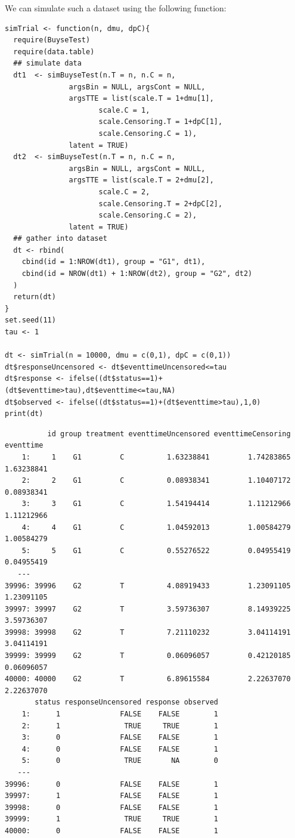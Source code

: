 \documentclass[12pt]{article}
\begin{document}
\clearpage

We can simulate such a dataset using the following function:
\lstset{language=r,label= ,caption= ,captionpos=b,numbers=none}
\begin{lstlisting}
simTrial <- function(n, dmu, dpC){
  require(BuyseTest)
  require(data.table)
  ## simulate data
  dt1  <- simBuyseTest(n.T = n, n.C = n, 
		       argsBin = NULL, argsCont = NULL, 
		       argsTTE = list(scale.T = 1+dmu[1],
				      scale.C = 1,
				      scale.Censoring.T = 1+dpC[1],
				      scale.Censoring.C = 1),
		       latent = TRUE)
  dt2  <- simBuyseTest(n.T = n, n.C = n, 
		       argsBin = NULL, argsCont = NULL, 
		       argsTTE = list(scale.T = 2+dmu[2],
				      scale.C = 2,
				      scale.Censoring.T = 2+dpC[2],
				      scale.Censoring.C = 2),
		       latent = TRUE)
  ## gather into dataset
  dt <- rbind(
    cbind(id = 1:NROW(dt1), group = "G1", dt1),
    cbind(id = NROW(dt1) + 1:NROW(dt2), group = "G2", dt2)
  )
  return(dt)
}
set.seed(11)
tau <- 1

dt <- simTrial(n = 10000, dmu = c(0,1), dpC = c(0,1))
dt$responseUncensored <- dt$eventtimeUncensored<=tau
dt$response <- ifelse((dt$status==1)+(dt$eventtime>tau),dt$eventtime<=tau,NA)
dt$observed <- ifelse((dt$status==1)+(dt$eventtime>tau),1,0)
print(dt)
\end{lstlisting}

\begin{verbatim}
          id group treatment eventtimeUncensored eventtimeCensoring  eventtime
    1:     1    G1         C          1.63238841         1.74283865 1.63238841
    2:     2    G1         C          0.08938341         1.10407172 0.08938341
    3:     3    G1         C          1.54194414         1.11212966 1.11212966
    4:     4    G1         C          1.04592013         1.00584279 1.00584279
    5:     5    G1         C          0.55276522         0.04955419 0.04955419
   ---                                                                        
39996: 39996    G2         T          4.08919433         1.23091105 1.23091105
39997: 39997    G2         T          3.59736307         8.14939225 3.59736307
39998: 39998    G2         T          7.21110232         3.04114191 3.04114191
39999: 39999    G2         T          0.06096057         0.42120185 0.06096057
40000: 40000    G2         T          6.89615584         2.22637070 2.22637070
       status responseUncensored response observed
    1:      1              FALSE    FALSE        1
    2:      1               TRUE     TRUE        1
    3:      0              FALSE    FALSE        1
    4:      0              FALSE    FALSE        1
    5:      0               TRUE       NA        0
   ---                                            
39996:      0              FALSE    FALSE        1
39997:      1              FALSE    FALSE        1
39998:      0              FALSE    FALSE        1
39999:      1               TRUE     TRUE        1
40000:      0              FALSE    FALSE        1
\end{verbatim}
\end{document}
